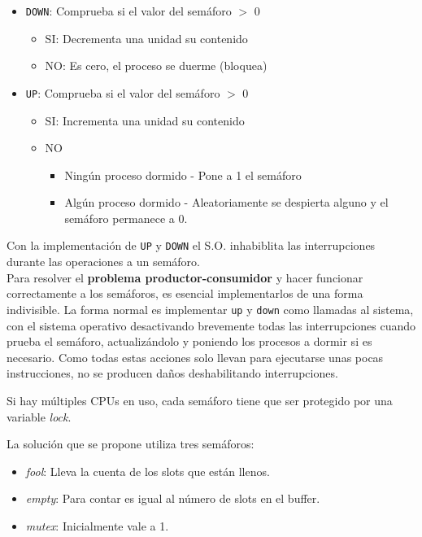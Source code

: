 \documentclass[10pt,portrait, twocolumn]{article}
\begin{document}
	\begin{itemize}
	\item \texttt{DOWN}: Comprueba si el valor del semáforo $>$ 0
		\begin{itemize}
		\item SI: Decrementa una unidad su contenido
		\item  NO: Es cero, el proceso se duerme (bloquea)
		\end{itemize}
	
	\item \texttt{UP}: Comprueba si el valor del semáforo $>$ 0
		\begin{itemize}
		\item SI: Incrementa una unidad su contenido 
		\item NO
			\begin{itemize}
			\item Ningún proceso dormido - Pone a 1 el semáforo
			\item Algún proceso dormido - Aleatoriamente se despierta alguno y el semáforo permanece a 0.
			\end{itemize}
		\end{itemize}
	\end{itemize}

Con la implementación de \texttt{UP} y \texttt{DOWN} el S.O. inhabiblita las interrupciones durante las operaciones a un semáforo.\\

Para resolver el \textbf{problema productor-consumidor} y hacer funcionar correctamente a los semáforos, es esencial implementarlos de una forma indivisible. La forma normal es implementar \texttt{up} y \texttt{down} como llamadas al sistema, con el sistema operativo desactivando brevemente todas las interrupciones cuando prueba el semáforo, actualizándolo y poniendo los procesos a dormir si es necesario. Como todas estas acciones solo llevan para ejecutarse unas pocas instrucciones, no se producen daños deshabilitando interrupciones.

	\quad Si hay múltiples CPUs en uso, cada semáforo tiene que ser protegido por una variable \textit{lock}.
	
	\quad La solución que se propone utiliza tres semáforos:
	
	\begin{itemize}
		\item \textit{fool}: Lleva la cuenta de los slots que están llenos.
		\item \textit{empty}: Para contar es igual al número de slots en el buffer.
		\item \textit{mutex}: Inicialmente vale a 1.
	\end{itemize}
	
\end{document}
